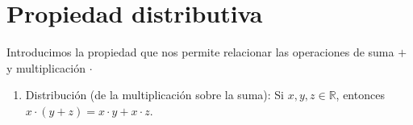 \documentclass[11pt]{article}
\newcommand{\R}{\mathbb{R}}
\begin{document}
\section*{Propiedad distributiva}

Introducimos la propiedad que nos permite relacionar las operaciones de suma $+$ y multiplicación $\cdot$

\begin{enumerate}[start=11]%
    \item Distribución (de la multiplicación sobre la suma): Si $x,y,z\in \R$, entonces $x\cdot (y+z)=x\cdot y+ x\cdot z$.
\end{enumerate}
\end{document}
